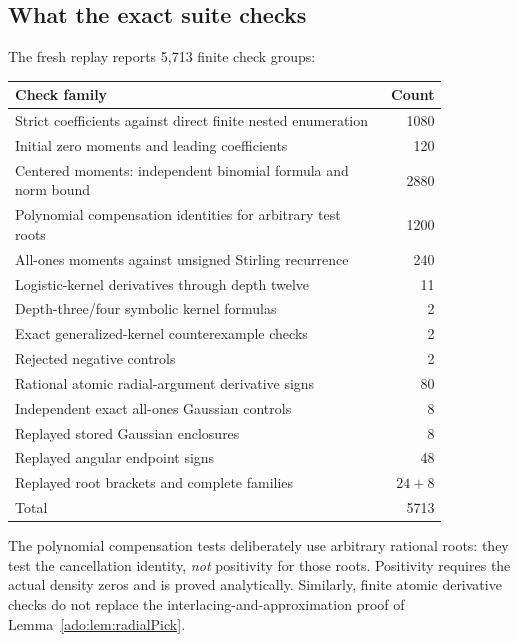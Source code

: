 \subsection{What the exact suite checks}
The fresh replay reports 5,713 finite check groups:
\begin{center}\small
\begin{tabular}{@{}p{0.86\linewidth}r@{}}
\toprule
Check family & Count\\
\midrule
Strict coefficients against direct finite nested enumeration & 1080\\
Initial zero moments and leading coefficients & 120\\
Centered moments: independent binomial formula and norm bound & 2880\\
Polynomial compensation identities for arbitrary test roots & 1200\\
All-ones moments against unsigned Stirling recurrence & 240\\
Logistic-kernel derivatives through depth twelve & 11\\
Depth-three/four symbolic kernel formulas & 2\\
Exact generalized-kernel counterexample checks & 2\\
Rejected negative controls & 2\\
Rational atomic radial-argument derivative signs & 80\\
Independent exact all-ones Gaussian controls & 8\\
Replayed stored Gaussian enclosures & 8\\
Replayed angular endpoint signs & 48\\
Replayed root brackets and complete families & $24+8$\\
\midrule
Total & 5713\\
\bottomrule
\end{tabular}
\end{center}
The polynomial compensation tests deliberately use arbitrary rational
roots: they test the cancellation identity, \emph{not} positivity for
those roots. Positivity requires the actual density zeros and is proved
analytically. Similarly, finite atomic derivative checks do not replace
the interlacing-and-approximation proof of
Lemma~\ref{ado:lem:radialPick}.

